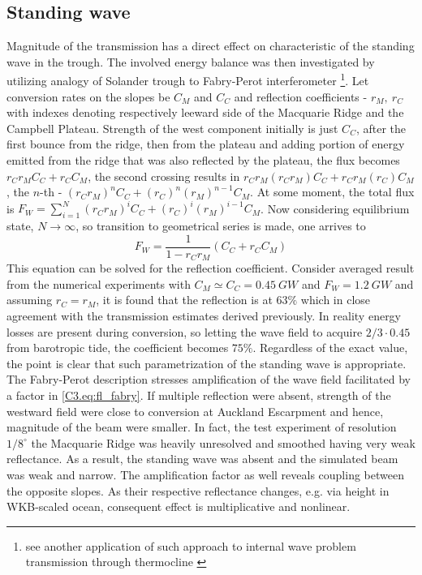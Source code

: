 \documentclass[12pt]{article}
\begin{document}
\subsection{Standing wave}
Magnitude of the transmission has a direct effect on characteristic of the standing wave in the 
trough. The involved energy balance was then investigated by utilizing analogy of Solander trough 
to Fabry-Perot interferometer \footnote{see another application of such approach to internal wave 
problem transmission through thermocline \citep{peacok}}. Let conversion rates on the slopes be 
$C_M$ and $C_C$ and reflection coefficients - $r_M,~r_C$ with indexes denoting respectively leeward 
side of the Macquarie Ridge and the Campbell Plateau. Strength of the west component initially is 
just $C_C$, after the first bounce from the ridge, then from the plateau and adding portion of 
energy emitted from the ridge that was also reflected by the plateau, the flux becomes $r_C r_M C_C 
+ r_C C_M$, the second crossing results in $r_C r_M (r_C r_M) C_C + r_C r_M (r_C) C_M$, the $n$-th 
- $(r_C r_M)^n C_C + (r_C)^n (r_M)^{n-1} C_M$. At some moment, the total flux is $F_W = 
\sum_{i = 1}^N (r_C r_M)^i C_C + (r_C)^i (r_M)^{i-1} C_M$. Now considering equilibrium state, $N 
\rightarrow \infty$, so transition to geometrical series is made, one arrives to
\begin{equation}
\label{C3.eq:fl_fabry}
F_W = \frac{1}{1 - r_C r_M} (C_C + r_C C_M)
\end{equation}
This equation can be solved for the reflection coefficient. Consider averaged result 
from the numerical experiments  with $C_M \simeq C_C = 0.45~GW$ and 
$F_W = 1.2~GW$ and assuming $r_C = r_M$, it is found that the reflection is at $63\%$ which in 
close agreement with the transmission estimates derived previously. In reality energy losses are 
present during conversion, so letting the wave field to acquire $2/3 \cdot 0.45$ 
from barotropic tide, the coefficient becomes $75\%$. Regardless of the exact value, the point is 
clear that such parametrization of the standing wave is appropriate.\\

The Fabry-Perot description stresses amplification of the wave field facilitated by a factor in 
\eqref{C3.eq:fl_fabry}. If multiple reflection were absent, strength of the westward field were 
close to conversion at Auckland Escarpment and hence, magnitude of the beam were smaller. In fact, 
the test experiment of resolution $1/8^{\circ}$ the Macquarie Ridge was heavily unresolved and 
smoothed having very weak reflectance. As a result, the standing wave was absent and the simulated 
beam was weak and narrow. The amplification factor as well reveals coupling between the opposite 
slopes. As their respective reflectance changes, e.g. via height in WKB-scaled ocean, consequent 
effect is multiplicative and nonlinear.\\
\end{document}
